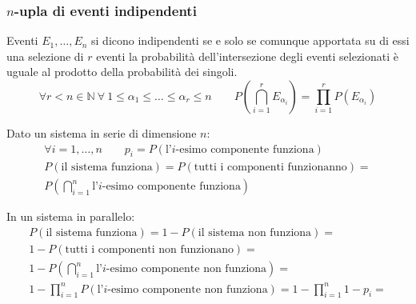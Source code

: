 \subsubsection{\texorpdfstring{$n$}{n}-upla di eventi indipendenti}
\begin{defin}
	Eventi $E_1,\dots,E_n$ si dicono indipendenti se e solo se comunque apportata su di essi una selezione di $r$ eventi la probabilità dell'intersezione degli eventi selezionati è uguale al prodotto della probabilità dei singoli.
	\begin{equation*}
		\forall r<n\in\mathbb{N}~\forall~1\leq \alpha_1 \leq\dots\leq\alpha_r\leq n \qquad P \left(\bigcap_{i=1}^r E_{\alpha_i} \right)=\prod_{i=1}^r P(E_{\alpha_i})
	\end{equation*}
\end{defin}

\begin{examp}
	Dato un sistema in serie di dimensione $n$:
	\begin{gather*}
		\forall i=1,\dots,n \qquad p_i=P(\text{l'}i\text{-esimo componente funziona}) \\[1ex]
		P(\text{il sistema funziona}) = P(\text{tutti i componenti funzionanno}) = \\
		P\left(\bigcap_{i=1}^n \text{l'}i\text{-esimo componente funziona}\right)
	\end{gather*}

	In un sistema in parallelo:
	\begin{gather*}
		P(\text{il sistema funziona}) = 1-P(\text{il sistema non funziona}) = \\[1ex]
		1-P(\text{tutti i componenti non funzionano}) = \\[1ex]
		1- P\left(\bigcap_{i=1}^n \text{l'}i\text{-esimo componente non funziona}\right) = \\[1ex]
		1-\prod_{i=1}^n P(\text{l'}i\text{-esimo componente non funziona}) =
		1-\prod_{i=1}^n 1-p_i =
	\end{gather*}
\end{examp}
